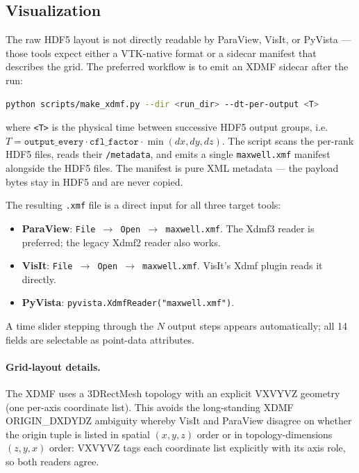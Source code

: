 \documentclass[11pt]{article}
\begin{document}
\subsection{Visualization}
\label{sec:visualization}

The raw HDF5 layout is not directly readable by ParaView, VisIt, or
PyVista — those tools expect either a VTK-native format or a sidecar
manifest that describes the grid. The preferred workflow is to emit an
XDMF sidecar after the run:

\begin{lstlisting}[language=bash]
python scripts/make_xdmf.py --dir <run_dir> --dt-per-output <T>
\end{lstlisting}

where \texttt{<T>} is the physical time between successive HDF5 output
groups, i.e.\
$T = \mathtt{output\_every} \cdot \mathtt{cfl\_factor} \cdot \min(dx, dy, dz)$.
The script scans the per-rank HDF5 files, reads their \texttt{/metadata},
and emits a single \texttt{maxwell.xmf} manifest alongside the HDF5
files. The manifest is pure XML metadata — the payload bytes stay in
HDF5 and are never copied.

The resulting \texttt{.xmf} file is a direct input for all three
target tools:
\begin{itemize}
  \item \textbf{ParaView}: \texttt{File $\to$ Open $\to$ maxwell.xmf}.
    The Xdmf3 reader is preferred; the legacy Xdmf2 reader also
    works.
  \item \textbf{VisIt}: \texttt{File $\to$ Open $\to$ maxwell.xmf}.
    VisIt's Xdmf plugin reads it directly.
  \item \textbf{PyVista}: \texttt{pyvista.XdmfReader("maxwell.xmf")}.
\end{itemize}

A time slider stepping through the $N$ output steps appears
automatically; all 14 fields are selectable as point-data attributes.

\paragraph{Grid-layout details.} The XDMF uses a 3DRectMesh topology
with an explicit VXVYVZ geometry (one per-axis coordinate list).
This avoids the long-standing XDMF ORIGIN\_DXDYDZ ambiguity whereby
VisIt and ParaView disagree on whether the origin tuple is listed in
spatial $(x, y, z)$ order or in topology-dimensions $(z, y, x)$ order:
VXVYVZ tags each coordinate list explicitly with its axis role, so
both readers agree.
\end{document}
